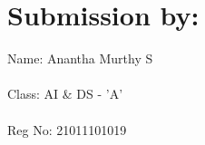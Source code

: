\documentclass{article}
\begin{document}
\section{Submission by:}
Name: Anantha Murthy S \\
\\
Class: AI \& DS - 'A' \\
\\
Reg No: 21011101019
\end{document}
